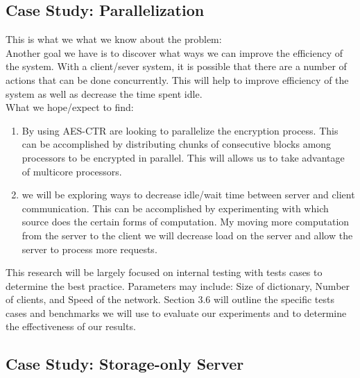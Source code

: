 \documentclass[onecolumn, draftclsnofoot,10pt, compsoc]{IEEEtran}
\begin{document}
\subsection {Case Study: Parallelization}
\label{subsec:parallel}



This is what we what we know about the problem: \\
Another goal we have is to discover what ways we can improve the efficiency of the system. With a client/sever system, it is possible that there are a number of actions that can be done concurrently. This will help to improve efficiency of the system as well as decrease the time spent idle. \\

What we hope/expect to find:
\begin{enumerate}
\item By using AES-CTR are looking to parallelize the encryption process. This can be accomplished by distributing chunks of consecutive blocks among processors to be encrypted in parallel. This will allows us to take advantage of multi\-core processors.
\item we will be exploring ways to decrease idle/wait time between server and client communication. This can be accomplished by experimenting with which source does the certain forms of computation. My moving more computation from the server to the client we will decrease load on the server and allow the server to process more requests. 
\end{enumerate}

This research will be largely focused on internal testing with tests cases to determine the best practice. Parameters may include: Size of dictionary, Number of clients, and Speed of the network. Section 3.6 will outline the specific tests cases and benchmarks we will use to evaluate our experiments and to determine the effectiveness of our results. 

\subsection {Case Study: Storage-only Server}
\label{subsec:dumbserver}
\end{document}
